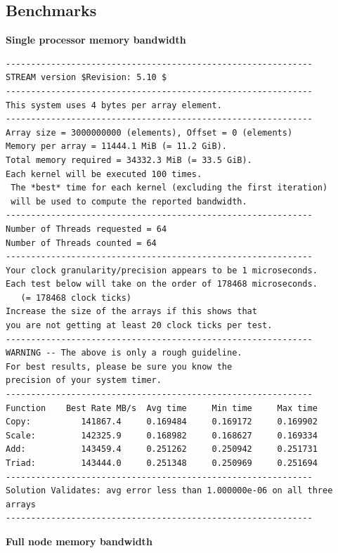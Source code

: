 \documentclass[letterpaper]{article}
\begin{document}
\subsection{Benchmarks}
\label{subsec:A1}
\textbf{Single processor memory bandwidth}
{\tiny
\begin{verbatim}
-------------------------------------------------------------
STREAM version $Revision: 5.10 $
-------------------------------------------------------------
This system uses 4 bytes per array element.
-------------------------------------------------------------
Array size = 3000000000 (elements), Offset = 0 (elements)
Memory per array = 11444.1 MiB (= 11.2 GiB).
Total memory required = 34332.3 MiB (= 33.5 GiB).
Each kernel will be executed 100 times.
 The *best* time for each kernel (excluding the first iteration)
 will be used to compute the reported bandwidth.
-------------------------------------------------------------
Number of Threads requested = 64
Number of Threads counted = 64
-------------------------------------------------------------
Your clock granularity/precision appears to be 1 microseconds.
Each test below will take on the order of 178468 microseconds.
   (= 178468 clock ticks)
Increase the size of the arrays if this shows that
you are not getting at least 20 clock ticks per test.
-------------------------------------------------------------
WARNING -- The above is only a rough guideline.
For best results, please be sure you know the
precision of your system timer.
-------------------------------------------------------------
Function    Best Rate MB/s  Avg time     Min time     Max time
Copy:          141867.4     0.169484     0.169172     0.169902
Scale:         142325.9     0.168982     0.168627     0.169334
Add:           143459.4     0.251262     0.250942     0.251731
Triad:         143444.0     0.251348     0.250969     0.251694
-------------------------------------------------------------
Solution Validates: avg error less than 1.000000e-06 on all three arrays
-------------------------------------------------------------
\end{verbatim}
}
\textbf{Full node memory bandwidth}
\end{document}
